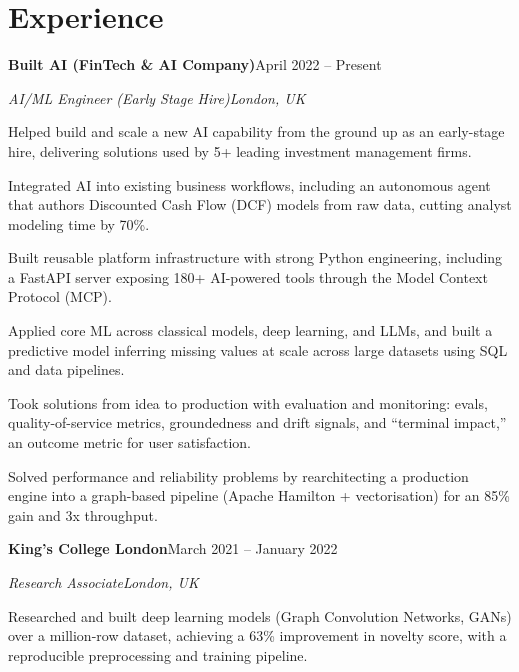 \documentclass[10pt,a4paper]{article}
\newcommand{\entry}[4]{%
  {\color{company}\bfseries #1}\hfill {\color{muted}#2}\par
  \vspace{1pt}
  {\itshape #3}\hfill {\color{muted}\itshape #4}\par
  \vspace{3pt}%
}
\begin{document}
\section{Experience}
\entry{Built AI (FinTech \& AI Company)}{April 2022 -- Present}{AI/ML Engineer (Early Stage Hire)}{London, UK}
\begin{tight}
  \item Helped build and scale a new AI capability from the ground up as an early-stage hire, delivering solutions used by 5+ leading investment management firms.
  \item Integrated AI into existing business workflows, including an autonomous agent that authors Discounted Cash Flow (DCF) models from raw data, cutting analyst modeling time by 70\%.
  \item Built reusable platform infrastructure with strong Python engineering, including a FastAPI server exposing 180+ AI-powered tools through the Model Context Protocol (MCP).
  \item Applied core ML across classical models, deep learning, and LLMs, and built a predictive model inferring missing values at scale across large datasets using SQL and data pipelines.
  \item Took solutions from idea to production with evaluation and monitoring: evals, quality-of-service metrics, groundedness and drift signals, and ``terminal impact,'' an outcome metric for user satisfaction.
  \item Solved performance and reliability problems by rearchitecting a production engine into a graph-based pipeline (Apache Hamilton + vectorisation) for an 85\% gain and 3x throughput.
\end{tight}

\entry{King's College London}{March 2021 -- January 2022}{Research Associate}{London, UK}
\begin{tight}
  \item Researched and built deep learning models (Graph Convolution Networks, GANs) over a million-row dataset, achieving a 63\% improvement in novelty score, with a reproducible preprocessing and training pipeline.
\end{tight}

\end{document}
